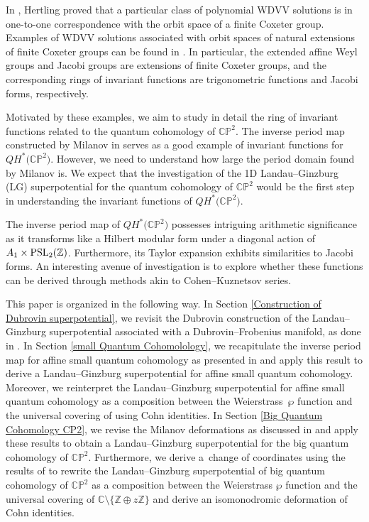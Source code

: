 \documentclass[pdftex]{sigma}
\numberwithin{equation}{section}
\begin{document}
In \cite{Hertling}, Hertling proved that a particular class of polynomial WDVV solutions is in one-to-one correspondence with the orbit space of a finite Coxeter group. Examples of WDVV solutions associated with orbit spaces of natural extensions of finite Coxeter groups can be found in \cite{Almeida1,Almeida2, Bertola, Bertola2,B.Dubrovin1,B.Dubrovin34,Zuo}. In particular, the extended affine Weyl groups and Jacobi groups are extensions of finite Coxeter groups, and the corresponding rings of invariant functions are trigonometric functions and Jacobi forms, respectively.

Motivated by these examples, we aim to study in detail the ring of invariant functions related to the quantum cohomology of $\mathbb{CP}^2$. The inverse period map constructed by Milanov in \cite{Milanov} serves as a good example of invariant functions for $QH^{*}\bigl(\mathbb{CP}^2\bigr)$. However, we need to understand how large the period domain found by Milanov is. We expect that the investigation of the 1D Landau--Ginzburg (LG) superpotential for the quantum cohomology of $\mathbb{CP}^2$ would be the first step in understanding the invariant functions of $QH^{*}\bigl(\mathbb{CP}^2\bigr)$.

The inverse period map of $QH^{*}\bigl(\mathbb{CP}^2\bigr)$ possesses intriguing arithmetic significance as it transforms like a Hilbert modular form under a diagonal action of $A_1\times {\rm PSL}_2(\mathbb{Z})$. Furthermore, its Taylor expansion exhibits similarities to Jacobi forms. An interesting avenue of investigation is to explore whether these functions can be derived through methods akin to Cohen--Kuznetsov series.

This paper is organized in the following way. In Section \ref{Construction of Dubrovin superpotential}, we revisit the Dubrovin construction of the Landau--Ginzburg superpotential associated with a Dubrovin--Frobenius manifold, as done in \cite{B.Dubrovin2}. In Section \ref{small Quantum Cohomolology}, we recapitulate the inverse period map for affine small quantum cohomology as presented in \cite{Milanov} and apply this result to derive a Landau--Ginzburg superpotential for affine small quantum cohomology. Moreover, we reinterpret the Landau--Ginzburg superpotential for affine small quantum cohomology as a composition between the Weierstrass~$\wp$ function and the universal covering of  using Cohn identities. In Section \ref{Big Quantum Cohomology CP2}, we revise the Milanov deformations as discussed in \cite{Milanov} and apply these results to obtain a Landau--Ginzburg superpotential for the big quantum cohomology of $\mathbb{CP}^2$. Furthermore, we derive a~change of coordinates using the results of \cite{Guzzetti} to rewrite the Landau--Ginzburg superpotential of big quantum cohomology of $\mathbb{CP}^2$ as a composition between the Weierstrass $\wp$ function and the universal covering of $\mathbb{C}\setminus\{\mathbb{Z}\oplus z\mathbb{Z}\}$ and derive an isomonodromic deformation of Cohn identities.
\end{document}
